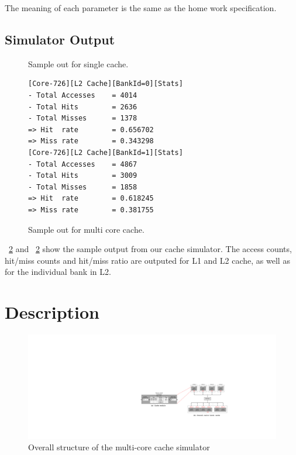 \documentclass[12pt]{report}
\newcommand{\Fig}[1]{\figurename~\ref{#1}}
\begin{document}
The meaning of each parameter is the same as the home work specification.

\subsection{Simulator Output}

\begin{figure}[h]

\caption{Sample out for single cache.}
\label{fig:singlecache.output}
\end{figure}

\begin{figure}[!h]
%
\begin{lstlisting}
[Core-726][L2 Cache][BankId=0][Stats]
- Total Accesses	= 4014
- Total Hits		= 2636
- Total Misses		= 1378
=> Hit  rate		= 0.656702
=> Miss rate		= 0.343298
[Core-726][L2 Cache][BankId=1][Stats]
- Total Accesses	= 4867
- Total Hits		= 3009
- Total Misses		= 1858
=> Hit  rate		= 0.618245
=> Miss rate		= 0.381755
\end{lstlisting}
\caption{Sample out for multi core cache.}
\label{fig:singlecache.output}
\end{figure}

\Fig{fig:singlecache.output} and \Fig{fig:singlecache.output} show the sample output from our cache simulator. The access counts, hit/miss counts and hit/miss ratio are outputed for L1 and L2 cache, as well as for the individual bank in L2. 


\newpage
\section{Description}
\begin{figure}[!h]
\begin{minipage}[b]{\textwidth}
 \centering
 \includegraphics[trim=0mm 0mm 0mm 0mm,clip,width=0.98\linewidth]{figs/cache_structure.pdf}
 \caption{Overall structure of the multi-core cache simulator}
 \label{fig:cache_structure}
\end{minipage}
\end{figure}
\end{document}
